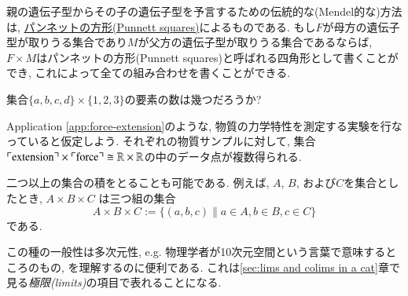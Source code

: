 \begin{application}
親の遺伝子型からその子の遺伝子型を予言するための伝統的な(Mendel的な)方法は, \href{http://en.wikipedia.org/wiki/Punnett_square}{パンネットの方形(Punnett squares)}によるものである. もし$F$が母方の遺伝子型が取りうる集合であり$M$が父方の遺伝子型が取りうる集合であるならば, $F\times M$はパンネットの方形(Punnett squares)と呼ばれる四角形として書くことができ, これによって全ての組み合わせを書くことができる.
\end{application}

\begin{exercise}
集合$\{a,b,c,d\}\times\{1,2,3\}$の要素の数は幾つだろうか?
\end{exercise}

\begin{application}


Application \ref{app:force-extension}のような, 物質の力学特性を測定する実験を行なっていると仮定しよう. それぞれの物質サンプルに対して, 集合$\fakebox{extension}\times\fakebox{force}\iso\RR\times\RR$の中のデータ点が複数得られる.

\end{application}

\begin{remark}


二つ以上の集合の積をとることも可能である. 例えば, $A$, $B$, および$C$を集合としたとき, 
$A\times B\times C$ は三つ組の集合 
$$A\times B\times C:=\{(a,b,c)\|a\in A, b\in B, c\in C\}$$
である.


この種の一般性は多次元性, e.g. 物理学者が10次元空間という言葉で意味するところのもの, を理解するのに便利である. これは\ref{sec:lims and colims in a cat}章で見る\emph{極限(limits)}の項目で表れることになる.

\end{remark}

